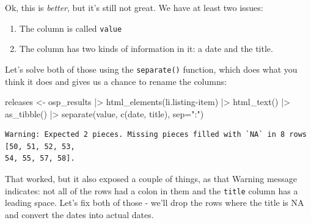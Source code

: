 \documentclass[
  letterpaper,
  DIV=11,
  numbers=noendperiod]{scrreprt}
\newenvironment{Shaded}{\begin{snugshade}}{\end{snugshade}}
\newcommand{\AttributeTok}[1]{\textcolor[rgb]{0.40,0.45,0.13}{#1}}
\newcommand{\FunctionTok}[1]{\textcolor[rgb]{0.28,0.35,0.67}{#1}}
\newcommand{\NormalTok}[1]{\textcolor[rgb]{0.00,0.23,0.31}{#1}}
\newcommand{\OtherTok}[1]{\textcolor[rgb]{0.00,0.23,0.31}{#1}}
\newcommand{\SpecialCharTok}[1]{\textcolor[rgb]{0.37,0.37,0.37}{#1}}
\newcommand{\StringTok}[1]{\textcolor[rgb]{0.13,0.47,0.30}{#1}}
\providecommand{\tightlist}{%
  \setlength{\itemsep}{0pt}\setlength{\parskip}{0pt}}\usepackage{longtable,booktabs,array}
\begin{document}
Ok, this is \emph{better}, but it's still not great. We have at least
two issues:

\begin{enumerate}
\def\labelenumi{\arabic{enumi}.}
\tightlist
\item
  The column is called \texttt{value}
\item
  The column has two kinds of information in it: a date and the title.
\end{enumerate}

Let's solve both of those using the \texttt{separate()} function, which
does what you think it does and gives us a chance to rename the columns:

\begin{Shaded}
\begin{Highlighting}[]
\NormalTok{releases }\OtherTok{\textless{}{-}}\NormalTok{ osp\_results }\SpecialCharTok{|\textgreater{}} \FunctionTok{html\_elements}\NormalTok{(}\StringTok{\textquotesingle{}li.listing{-}item\textquotesingle{}}\NormalTok{) }\SpecialCharTok{|\textgreater{}} \FunctionTok{html\_text}\NormalTok{() }\SpecialCharTok{|\textgreater{}} \FunctionTok{as\_tibble}\NormalTok{() }\SpecialCharTok{|\textgreater{}} \FunctionTok{separate}\NormalTok{(value, }\FunctionTok{c}\NormalTok{(}\StringTok{\textquotesingle{}date\textquotesingle{}}\NormalTok{, }\StringTok{\textquotesingle{}title\textquotesingle{}}\NormalTok{), }\AttributeTok{sep=}\StringTok{":"}\NormalTok{)}
\end{Highlighting}
\end{Shaded}

\begin{verbatim}
Warning: Expected 2 pieces. Missing pieces filled with `NA` in 8 rows [50, 51, 52, 53,
54, 55, 57, 58].
\end{verbatim}

That worked, but it also exposed a couple of things, as that Warning
message indicates: not all of the rows had a colon in them and the
\texttt{title} column has a leading space. Let's fix both of those -
we'll drop the rows where the title is NA and convert the dates into
actual dates.
\end{document}
